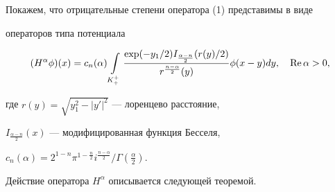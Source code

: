 Покажем, что отрицательные степени оператора (1) представимы в виде


операторов типа потенциала


\begin{equation}


(H^\alpha\phi)(x)=c_n(\alpha)\int\limits_{K_+^+}


\frac{\exp(-y_1/2)I_{\frac{\alpha-n}{2}}(r(y)/2)}


{r^{\frac{n-\alpha}{2}}(y)}\phi(x-y)dy,\quad \R\alpha>0,


\end{equation}


где $r(y)=\sqrt{y_1^2-|y'|^2}$ --- лоренцево расстояние,


$I_{\frac{\alpha-n}{2}}(x)$ --- модифицированная функция Бесселя,


$c_n(\alpha)=2^{1-n}{\pi}^{1-\frac{n}{2}}i^{\frac{n-\alpha}{2}}/


\Gamma(\frac{\alpha}{2})$.





Действие оператора $H^\alpha$ описывается следующей теоремой.





